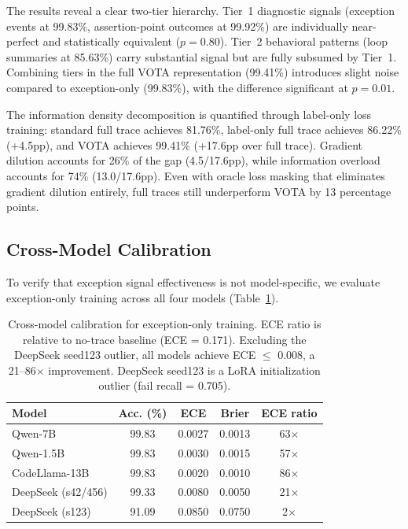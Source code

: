 \documentclass[11pt,a4paper]{article}
\begin{document}
The results reveal a clear two-tier hierarchy. Tier~1 diagnostic signals (exception events at 99.83\%, assertion-point outcomes at 99.92\%) are individually near-perfect and statistically equivalent ($p = 0.80$). Tier~2 behavioral patterns (loop summaries at 85.63\%) carry substantial signal but are fully subsumed by Tier~1. Combining tiers in the full VOTA representation (99.41\%) introduces slight noise compared to exception-only (99.83\%), with the difference significant at $p = 0.01$.

The information density decomposition is quantified through label-only loss training: standard full trace achieves 81.76\%, label-only full trace achieves 86.22\% (+4.5pp), and VOTA achieves 99.41\% (+17.6pp over full trace). Gradient dilution accounts for 26\% of the gap (4.5/17.6pp), while information overload accounts for 74\% (13.0/17.6pp). Even with oracle loss masking that eliminates gradient dilution entirely, full traces still underperform VOTA by 13 percentage points.

\subsection{Cross-Model Calibration}
\label{sec:calibration}

To verify that exception signal effectiveness is not model-specific, we evaluate exception-only training across all four models (Table~\ref{tab:calibration}).

\begin{table}[t]
\centering
\small
\begin{tabular}{lcccc}
\toprule
\textbf{Model} & \textbf{Acc. (\%)} & \textbf{ECE} & \textbf{Brier} & \textbf{ECE ratio} \\
\midrule
Qwen-7B & 99.83 & 0.0027 & 0.0013 & 63$\times$ \\
Qwen-1.5B & 99.83 & 0.0030 & 0.0015 & 57$\times$ \\
CodeLlama-13B & 99.83 & 0.0020 & 0.0010 & 86$\times$ \\
DeepSeek (s42/456) & 99.33 & 0.0080 & 0.0050 & 21$\times$ \\
DeepSeek (s123) & 91.09 & 0.0850 & 0.0750 & 2$\times$ \\
\bottomrule
\end{tabular}
\caption{Cross-model calibration for exception-only training. ECE ratio is relative to no-trace baseline (ECE = 0.171). Excluding the DeepSeek seed123 outlier, all models achieve ECE $\leq$ 0.008, a 21--86$\times$ improvement. DeepSeek seed123 is a LoRA initialization outlier (fail recall = 0.705).}
\label{tab:calibration}
\end{table}
\end{document}
